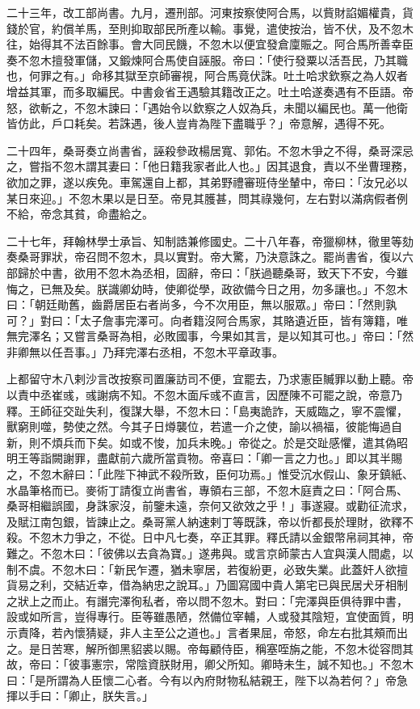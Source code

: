 \begin{pinyinscope}
 二十三年，改工部尚書。九月，遷刑部。河東按察使阿合馬，以貲財諂媚權貴，貨錢於官，約償羊馬，至則抑取部民所產以輸。事覺，遣使按治，皆不伏，及不忽木往，始得其不法百餘事。會大同民饑，不忽木以便宜發倉廩賑之。阿合馬所善幸臣奏不忽木擅發軍儲，又鍛煉阿合馬使自誣服。帝曰：「使行發粟以活吾民，乃其職也，何罪之有。」命移其獄至京師審視，阿合馬竟伏誅。吐土哈求欽察之為人奴者增益其軍，而多取編民。中書僉省王遇驗其籍改正之。吐土哈遂奏遇有不臣語。帝怒，欲斬之，不忽木諫曰：「遇始令以欽察之人奴為兵，未聞以編民也。萬一他衛皆仿此，戶口耗矣。若誅遇，後人豈肯為陛下盡職乎？」帝意解，遇得不死。



 二十四年，桑哥奏立尚書省，誣殺參政楊居寬、郭佑。不忽木爭之不得，桑哥深忌之，嘗指不忽木謂其妻曰：「他日籍我家者此人也。」因其退食，責以不坐曹理務，欲加之罪，遂以疾免。車駕還自上都，其弟野禮審班侍坐輦中，帝曰：「汝兄必以某日來迎。」不忽木果以是日至。帝見其臒甚，問其祿幾何，左右對以滿病假者例不給，帝念其貧，命盡給之。



 二十七年，拜翰林學士承旨、知制誥兼修國史。二十八年春，帝獵柳林，徹里等劾奏桑哥罪狀，帝召問不忽木，具以實對。帝大驚，乃決意誅之。罷尚書省，復以六部歸於中書，欲用不忽木為丞相，固辭，帝曰：「朕過聽桑哥，致天下不安，今雖悔之，已無及矣。朕識卿幼時，使卿從學，政欲備今日之用，勿多讓也。」不忽木曰：「朝廷勛舊，齒爵居臣右者尚多，今不次用臣，無以服眾。」帝曰：「然則孰可？」對曰：「太子詹事完澤可。向者籍沒阿合馬家，其賂遺近臣，皆有簿籍，唯無完澤名；又嘗言桑哥為相，必敗國事，今果如其言，是以知其可也。」帝曰：「然非卿無以任吾事。」乃拜完澤右丞相，不忽木平章政事。



 上都留守木八剌沙言改按察司置廉訪司不便，宜罷去，乃求憲臣贓罪以動上聽。帝以責中丞崔彧，彧謝病不知。不忽木面斥彧不直言，因歷陳不可罷之說，帝意乃釋。王師征交趾失利，復謀大舉，不忽木曰：「島夷詭詐，天威臨之，寧不震懼，獸窮則噬，勢使之然。今其子日燇襲位，若遣一介之使，諭以禍福，彼能悔過自新，則不煩兵而下矣。如或不悛，加兵未晚。」帝從之。於是交趾感懼，遣其偽昭明王等詣闕謝罪，盡獻前六歲所當貢物。帝喜曰：「卿一言之力也。」即以其半賜之，不忽木辭曰：「此陛下神武不殺所致，臣何功焉。」惟受沉水假山、象牙鎮紙、水晶筆格而已。麥術丁請復立尚書省，專領右三部，不忽木庭責之曰：「阿合馬、桑哥相繼誤國，身誅家沒，前鑒未遠，奈何又欲效之乎！」事遂寢。或勸征流求，及賦江南包銀，皆諫止之。桑哥黨人納速剌丁等既誅，帝以忻都長於理財，欲釋不殺。不忽木力爭之，不從。日中凡七奏，卒正其罪。釋氏請以金銀幣帛祠其神，帝難之。不忽木曰：「彼佛以去貪為寶。」遂弗與。或言京師蒙古人宜與漢人間處，以制不虞。不忽木曰：「新民乍遷，猶未寧居，若復紛更，必致失業。此蓋奸人欲擅貨易之利，交結近幸，借為納忠之說耳。」乃圖寫國中貴人第宅已與民居犬牙相制之狀上之而止。有譖完澤徇私者，帝以問不忽木。對曰：「完澤與臣俱待罪中書，設或如所言，豈得專行。臣等雖愚陋，然備位宰輔，人或發其陰短，宜使面質，明示責降，若內懷猜疑，非人主至公之道也。」言者果屈，帝怒，命左右批其頰而出之。是日苦寒，解所御黑貂裘以賜。帝每顧侍臣，稱塞咥旃之能，不忽木從容問其故，帝曰：「彼事憲宗，常陰資朕財用，卿父所知。卿時未生，誠不知也。」不忽木曰：「是所謂為人臣懷二心者。今有以內府財物私結親王，陛下以為若何？」帝急揮以手曰：「卿止，朕失言。」




\end{pinyinscope}
